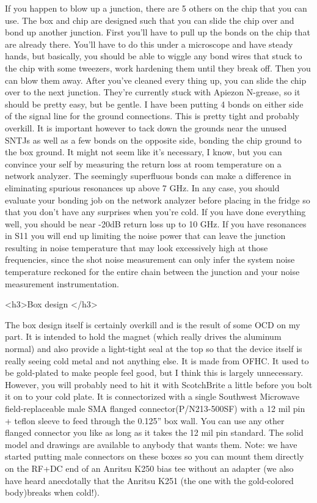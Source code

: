 \documentclass[11pt]{article}
\begin{document}
If you happen to blow up a junction, there are 5 others on the chip that you can use. The box and chip are designed such that you can slide the chip over and bond up another junction. First you’ll have to pull up the bonds on the chip that are already there. You’ll have to do this under a microscope and have steady hands, but basically, you should be able to wiggle any bond wires that stuck to the chip with some tweezers, work hardening them until they break oﬀ. Then you can blow them away. After you’ve cleaned every thing up, you can slide the chip over to the next junction.  They’re currently stuck with Apiezon N-grease, so it should be pretty easy, but be gentle. I have been putting 4 bonds on either side of the signal line for the ground connections. This is pretty tight and probably overkill. It is important however to tack down the grounds near the unused SNTJs as well as a few bonds on the opposite side, bonding the chip ground to the box ground. It might not seem like it’s necessary, I know, but you can convince your self by measuring the return loss at room temperature on a network analyzer. The seemingly superﬂuous bonds can make a diﬀerence in eliminating spurious resonances up above 7 GHz. In any case, you should evaluate your bonding job on the network analyzer before placing in the fridge so that you don’t have any surprises when you’re cold. If you have done everything well, you should be near -20dB return loss up to 10 GHz. If you have resonances in S11 you will end up limiting the noise power that can leave the junction resulting in noise temperature that may look excessively high at those frequencies, since the shot noise measurement can only infer the system noise temperature reckoned for the entire chain between the junction and your noise measurement instrumentation.

<h3>Box design </h3>



The box design itself is certainly overkill and is the result of some OCD on my part. It is intended to hold the magnet (which really drives the aluminum normal) and also provide a light-tight seal at the top so that the device itself is really seeing cold metal and not anything else. It is made from OFHC. It used to be gold-plated to make people feel good, but I think this is largely unnecessary. However, you will probably need to hit it with ScotchBrite a little before you bolt it on to your cold plate. It is connectorized with a single Southwest Microwave ﬁeld-replaceable male SMA ﬂanged connector(P/N213-500SF) with a 12 mil pin + teﬂon sleeve to feed through the 0.125” box wall. You can use any other ﬂanged connector you like as long as it takes the 12 mil pin standard. The solid model and drawings are available to anybody that wants them. Note: we have started putting male connectors on these boxes so you can mount them directly on the RF+DC end of an Anritsu K250 bias tee without an adapter (we also have heard anecdotally that the Anritsu K251 (the one with the gold-colored body)breaks when cold!).
\end{document}
